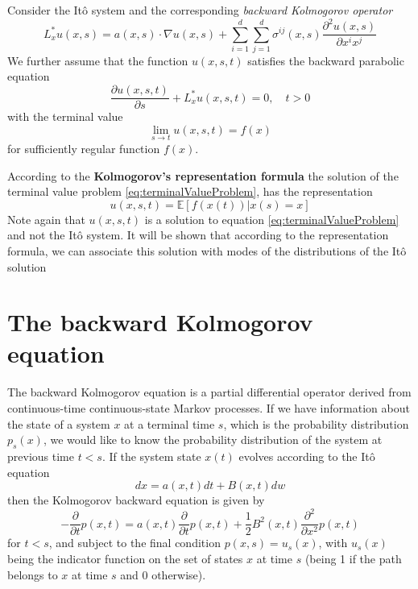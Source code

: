 \documentclass[12pt]{book}
\begin{document}
Consider the It\^o system and the corresponding \textit{backward Kolmogorov operator}
\begin{equation}\label{eq:backwardKolmogorovOperator}
	L^*_xu(x,s)=a(x,s)\cdot \nabla u(x,s)+\sum_{i=1}^d\sum_{j=1}^d \sigma^{ij}(x,s)\frac{\partial^2u(x,s)}{\partial x^ix^j}
\end{equation} 
We further assume that the function $u(x,s,t)$ satisfies the backward parabolic equation 
\begin{equation}\label{eq:terminalValueProblem}
	\frac{\partial u(x,s,t)}{\partial s}+L^*_x u(x,s,t)=0,\quad t>0
\end{equation}
with the terminal value 
\begin{equation*}
	\lim_{s\rightarrow t} u(x,s,t)=f(x)
\end{equation*}
for sufficiently regular function $f(x)$. 

According to the \textbf{Kolmogorov's representation formula} the solution of the terminal value problem \ref{eq:terminalValueProblem}, has the representation 
\begin{equation*}\label{eq:kolmogorovRepresentationFormula}
	u(x,s,t)=\mathbb{E}[f(x(t))|x(s)=x]
\end{equation*}
Note again that $u(x,s,t)$ is a solution to equation \ref{eq:terminalValueProblem} and not the It\^{o} system. It will be shown that according to the representation formula, we can associate this solution with modes of the distributions of the It\^{o} solution 


\section{The backward Kolmogorov equation}\label{section:backwardKolmogorovEquation}
The backward Kolmogorov equation is a partial differential operator derived from continuous-time continuous-state Markov processes. If we have information about the state of a system $x$ at a terminal time $s$, which is the probability distribution $p_s(x)$, we would like to know the probability distribution of the system at previous time $t<s$.
If the system state $x(t)$ evolves according to the It\^o equation 
\begin{equation*}
dx=a(x,t)dt+B(x,t)dw
\end{equation*}
then the Kolmogorov backward equation is given by 
\begin{equation}\label{eq:kolmogorovBackwardEquation}
-\frac{\partial}{\partial t}p(x,t) = a(x,t)\frac{\partial}{\partial t}p(x,t)+\frac{1}{2}B^2(x,t)\frac{\partial^2}{\partial x^2}p(x,t)
\end{equation}
for $t<s$, and subject to the final condition $p(x,s)=u_s(x)$, with $u_s(x)$ being the indicator function on the set of states $x$ at time $s$ (being 1 if the path belongs to $x$ at time $s$ and 0 otherwise).
\end{document}
